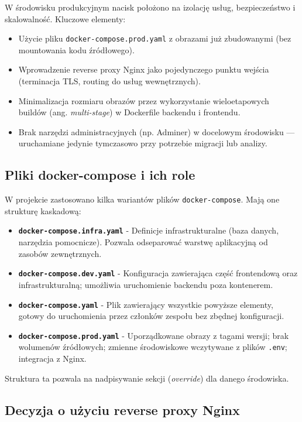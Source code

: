 W środowisku produkcyjnym nacisk położono na izolację usług, bezpieczeństwo i skalowalność. Kluczowe elementy:
\begin{itemize}
    \item Użycie pliku \texttt{docker-compose.prod.yaml} z obrazami już zbudowanymi (bez mountowania kodu źródłowego).
    \item Wprowadzenie reverse proxy Nginx jako pojedynczego punktu wejścia (terminacja TLS, routing do usług wewnętrznych).
    \item Minimalizacja rozmiaru obrazów przez wykorzystanie wieloetapowych buildów (ang. \textit{multi-stage}) w Dockerfile backendu i frontendu.
    \item Brak narzędzi administracyjnych (np. Adminer) w docelowym środowisku — uruchamiane jedynie tymczasowo przy potrzebie migracji lub analizy.
\end{itemize}

\subsection{Pliki docker-compose i ich role}

W projekcie zastosowano kilka wariantów plików \texttt{docker-compose}. Mają one strukturę kaskadową:
\begin{itemize}
    \item \textbf{\texttt{docker-compose.infra.yaml}} - Definicje infrastrukturalne (baza danych, narzędzia pomocnicze). Pozwala odseparować warstwę aplikacyjną od zasobów zewnętrznych.
    \item \textbf{\texttt{docker-compose.dev.yaml}} - Konfiguracja zawierająca część frontendową oraz infrastrukturalną; umożliwia uruchomienie backendu poza kontenerem.
    \item \textbf{\texttt{docker-compose.yaml}} - Plik zawierający wszystkie powyższe elementy, gotowy do uruchomienia przez członków zespołu bez zbędnej konfiguracji.
    \item \textbf{\texttt{docker-compose.prod.yaml}} - Uporządkowane obrazy z tagami wersji; brak wolumenów źródłowych; zmienne środowiskowe wczytywane z plików \texttt{.env}; integracja z Nginx.
\end{itemize}

Struktura ta pozwala na nadpisywanie sekcji (\textit{override}) dla danego środowiska.

\subsection{Decyzja o użyciu reverse proxy Nginx}

